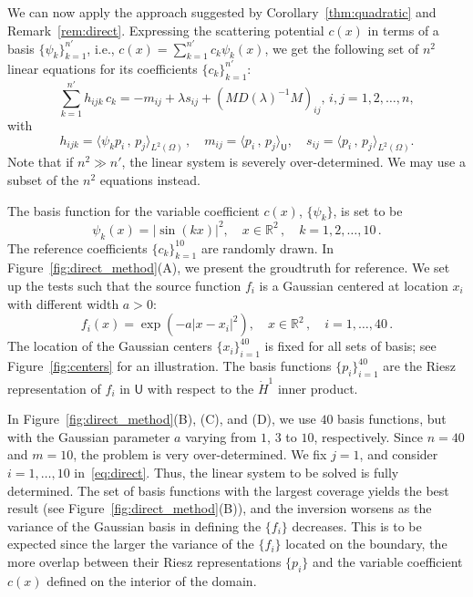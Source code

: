 \documentclass[12pt]{amsart}
\begin{document}
We can now apply the approach suggested by Corollary~\ref{thm:quadratic} and Remark~\ref{rem:direct}. Expressing the scattering potential $c(x)$ in terms of a basis $\{\psi_k\}_{k=1}^{n'}$, i.e., $c(x) = \sum_{k=1}^{n'} c_k \psi_k(x)$, we get the following set of $n^2$ linear equations for its coefficients $\{c_k\}_{k=1}^{n'}$:
\begin{equation}\label{eq:direct}
\sum_{k=1}^{n'} h_{ijk} \, c_k = -m_{ij} + \lambda s_{ij} + \left(MD(\lambda)^{-1}M\right)_{ij}, \, i,j = 1, 2, \ldots, n,
\end{equation}
with
\[
h_{ijk} = \langle \psi_k p_i\,, \,p_j\rangle_{L^2(\Omega)}\,, \quad m_{ij} = \langle p_i\,, \,p_j\rangle_{\mathsf{U}}, \quad s_{ij} = \langle p_i\,, \, p_j\rangle_{L^2(\Omega)}.
\]
Note that if $n^2 \gg n'$, the linear system is severely over-determined. We may use a subset of the $n^2$ equations instead.

The basis function for the variable coefficient $c(x)$, $\{\psi_k\}$, is set to be
\[
\psi_k(x) = |\sin ( k x )|^2, \quad x\in \mathbb{R}^2\,,\quad k = 1,2,\ldots, 10\,.
\]
The reference coefficients $\{c_k\}_{k=1}^{10}$ are randomly drawn. In Figure~\ref{fig:direct_method}(A), we present the groudtruth for reference. We set up the tests such that the source function $f_i$ is a Gaussian centered at location $x_i$ with different width $a>0$:
\[
f_i(x) = \exp{(-a|x-x_i|^2)},\quad x\in \mathbb{R}^2\,,\quad i = 1,\ldots,40\,.
\]
The location of the Gaussian centers $\{x_i\}_{i=1}^{40}$ is fixed for all sets of basis; see Figure~\ref{fig:centers} for an illustration. The basis functions $\{p_i\}_{i=1}^{40}$ are the Riesz representation of $f_i$ in $\mathsf{U}$ with respect to the $\dot{H}^1$ inner product. 



In Figure~\ref{fig:direct_method}(B), (C), and (D), we use $40$ basis functions, but with the Gaussian parameter $a$ varying from $1$, $3$ to $10$, respectively. Since $n = 40$ and $m = 10$, the problem is very over-determined. We fix $j=1$, and consider $i=1,\ldots, 10$ in~\eqref{eq:direct}. Thus, the linear system to be solved is fully determined. The set of basis functions with the largest coverage yields the best result (see Figure~\ref{fig:direct_method}(B)), and the inversion worsens as the variance of the Gaussian basis in defining the $\{f_i\}$ decreases. This is to be expected since the larger the variance of the $\{f_i\}$ located on the boundary, the more overlap between their Riesz representations $\{p_i\}$ and the variable coefficient $c(x)$ defined on the interior of the domain. 
\end{document}
